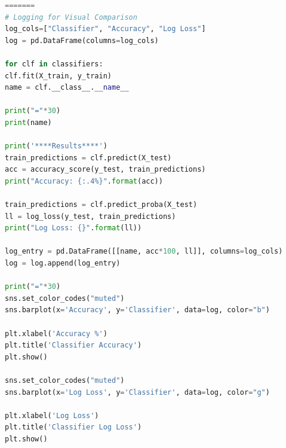 \documentclass{whutmod}
\begin{document}
\begin{lstlisting}[language=python]
=======
# Logging for Visual Comparison
log_cols=["Classifier", "Accuracy", "Log Loss"]
log = pd.DataFrame(columns=log_cols)

for clf in classifiers:
clf.fit(X_train, y_train)
name = clf.__class__.__name__

print("="*30)
print(name)

print('****Results****')
train_predictions = clf.predict(X_test)
acc = accuracy_score(y_test, train_predictions)
print("Accuracy: {:.4%}".format(acc))

train_predictions = clf.predict_proba(X_test)
ll = log_loss(y_test, train_predictions)
print("Log Loss: {}".format(ll))

log_entry = pd.DataFrame([[name, acc*100, ll]], columns=log_cols)
log = log.append(log_entry)

print("="*30)
sns.set_color_codes("muted")
sns.barplot(x='Accuracy', y='Classifier', data=log, color="b")

plt.xlabel('Accuracy %')
plt.title('Classifier Accuracy')
plt.show()

sns.set_color_codes("muted")
sns.barplot(x='Log Loss', y='Classifier', data=log, color="g")

plt.xlabel('Log Loss')
plt.title('Classifier Log Loss')
plt.show()
\end{lstlisting}
\end{document}
